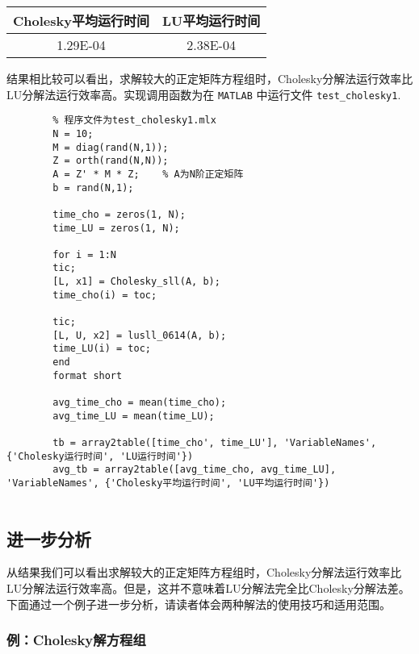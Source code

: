 \documentclass[12pt, a4paper, oneside]{ctexart}
\begin{document}
		\begin{table}[h]
			\centering
		\begin{tabular}{|c|c|}
			\hline
			\textbf{Cholesky平均运行时间} & \textbf{LU平均运行时间} \\ \hline
			1.29E-04                & 2.38E-04          \\ \hline
		\end{tabular}
	\end{table}
	
	结果相比较可以看出，求解较大的正定矩阵方程组时，Cholesky分解法运行效率比LU分解法运行效率高。实现调用函数为在 \texttt{MATLAB} 中运行文件 \texttt{test\_cholesky1}.
	
		\begin{lstlisting}
		% 程序文件为test_cholesky1.mlx
		N = 10;
		M = diag(rand(N,1)); 
		Z = orth(rand(N,N));
		A = Z' * M * Z;    % A为N阶正定矩阵
		b = rand(N,1);
		
		time_cho = zeros(1, N);
		time_LU = zeros(1, N);
		
		for i = 1:N
		tic;
		[L, x1] = Cholesky_sll(A, b);
		time_cho(i) = toc;
		
		tic;
		[L, U, x2] = lusll_0614(A, b);
		time_LU(i) = toc;
		end
		format short
		
		avg_time_cho = mean(time_cho);
		avg_time_LU = mean(time_LU);
		
		tb = array2table([time_cho', time_LU'], 'VariableNames', {'Cholesky运行时间', 'LU运行时间'})
		avg_tb = array2table([avg_time_cho, avg_time_LU], 'VariableNames', {'Cholesky平均运行时间', 'LU平均运行时间'})
		
	\end{lstlisting}
	

	\subsection{进一步分析}
	
	从结果我们可以看出求解较大的正定矩阵方程组时，Cholesky分解法运行效率比LU分解法运行效率高。但是，这并不意味着LU分解法完全比Cholesky分解法差。下面通过一个例子进一步分析，请读者体会两种解法的使用技巧和适用范围。
	\subsubsection{例：Cholesky解方程组}
	
\end{document}
